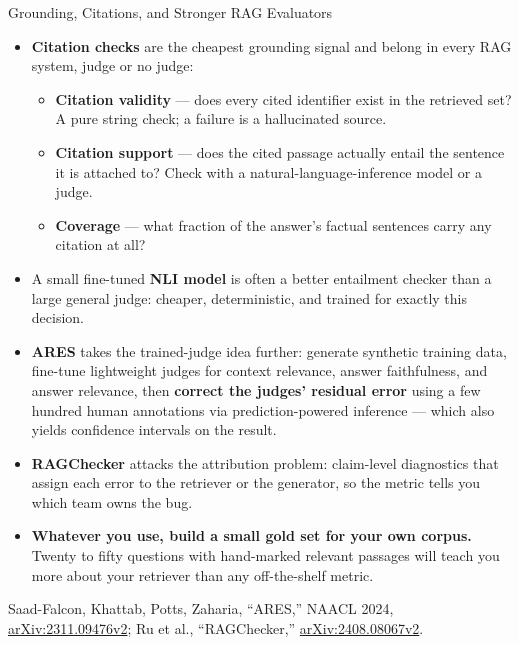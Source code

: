 \begin{frame}[allowframebreaks]{Grounding, Citations, and Stronger RAG Evaluators}
  \begin{itemize}\footnotesize\itemsep0.3em
    \item[\textcolor{red}{$\blacktriangleright$}] \textbf{Citation checks} are the cheapest grounding signal and belong in every RAG system, judge or no judge:
      \begin{itemize}\itemsep0.12em
        \item \textbf{Citation validity} --- does every cited identifier exist in the retrieved set? A pure string check; a failure is a hallucinated source.
        \item \textbf{Citation support} --- does the cited passage actually entail the sentence it is attached to? Check with a natural-language-inference model or a judge.
        \item \textbf{Coverage} --- what fraction of the answer's factual sentences carry any citation at all?
      \end{itemize}
    \item[\textcolor{red}{$\blacktriangleright$}] A small fine-tuned \textbf{NLI model} is often a better entailment checker than a large general judge: cheaper, deterministic, and trained for exactly this decision.
    \item[\textcolor{red}{$\blacktriangleright$}] \textbf{ARES} takes the trained-judge idea further: generate synthetic training data, fine-tune lightweight judges for context relevance, answer faithfulness, and answer relevance, then \textbf{correct the judges' residual error} using a few hundred human annotations via prediction-powered inference --- which also yields confidence intervals on the result.
    \item[\textcolor{red}{$\blacktriangleright$}] \textbf{RAGChecker} attacks the attribution problem: claim-level diagnostics that assign each error to the retriever or the generator, so the metric tells you which team owns the bug.
    \item[\textcolor{red}{$\blacktriangleright$}] \textbf{Whatever you use, build a small gold set for your own corpus.} Twenty to fifty questions with hand-marked relevant passages will teach you more about your retriever than any off-the-shelf metric.
  \end{itemize}
  \vspace{0.1em}
  {\scriptsize Saad-Falcon, Khattab, Potts, Zaharia, ``ARES,'' NAACL 2024, \href{https://arxiv.org/abs/2311.09476v2}{arXiv:2311.09476v2}; Ru et al., ``RAGChecker,'' \href{https://arxiv.org/abs/2408.08067v2}{arXiv:2408.08067v2}.}
\end{frame}
